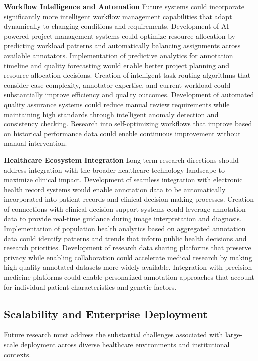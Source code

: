 \textbf{Workflow Intelligence and Automation}
Future systems could incorporate significantly more intelligent workflow management capabilities that adapt dynamically to changing conditions and requirements. Development of AI-powered project management systems could optimize resource allocation by predicting workload patterns and automatically balancing assignments across available annotators. Implementation of predictive analytics for annotation timeline and quality forecasting would enable better project planning and resource allocation decisions. Creation of intelligent task routing algorithms that consider case complexity, annotator expertise, and current workload could substantially improve efficiency and quality outcomes. Development of automated quality assurance systems could reduce manual review requirements while maintaining high standards through intelligent anomaly detection and consistency checking. Research into self-optimizing workflows that improve based on historical performance data could enable continuous improvement without manual intervention.

\textbf{Healthcare Ecosystem Integration}
Long-term research directions should address integration with the broader healthcare technology landscape to maximize clinical impact. Development of seamless integration with electronic health record systems would enable annotation data to be automatically incorporated into patient records and clinical decision-making processes. Creation of connections with clinical decision support systems could leverage annotation data to provide real-time guidance during image interpretation and diagnosis. Implementation of population health analytics based on aggregated annotation data could identify patterns and trends that inform public health decisions and research priorities. Development of research data sharing platforms that preserve privacy while enabling collaboration could accelerate medical research by making high-quality annotated datasets more widely available. Integration with precision medicine platforms could enable personalized annotation approaches that account for individual patient characteristics and genetic factors.

\subsection{Scalability and Enterprise Deployment}

Future research must address the substantial challenges associated with large-scale deployment across diverse healthcare environments and institutional contexts.

